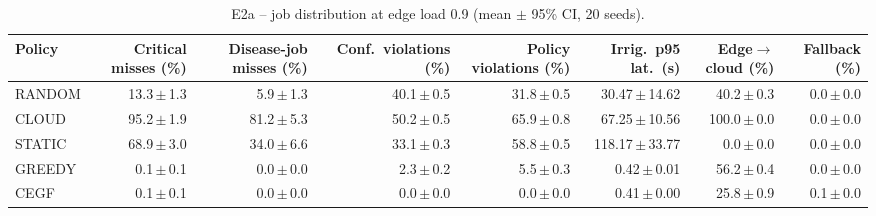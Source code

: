 \begin{table}[htbp]\scriptsize\centering
\caption{E2a -- job distribution at edge load 0.9 (mean $\pm$ 95\% CI, 20 seeds).}\label{tab:e2-0.9}
\begin{tabular}{lrrrrrrr}
\toprule
Policy & Critical misses (\%) & Disease-job misses (\%) & Conf.\ violations (\%) & Policy violations (\%) & Irrig.\ p95 lat.\ (s) & Edge$\to$cloud (\%) & Fallback (\%) \\
\midrule
RANDOM & 13.3\,$\pm$\,1.3 & 5.9\,$\pm$\,1.3 & 40.1\,$\pm$\,0.5 & 31.8\,$\pm$\,0.5 & 30.47\,$\pm$\,14.62 & 40.2\,$\pm$\,0.3 & 0.0\,$\pm$\,0.0 \\
CLOUD & 95.2\,$\pm$\,1.9 & 81.2\,$\pm$\,5.3 & 50.2\,$\pm$\,0.5 & 65.9\,$\pm$\,0.8 & 67.25\,$\pm$\,10.56 & 100.0\,$\pm$\,0.0 & 0.0\,$\pm$\,0.0 \\
STATIC & 68.9\,$\pm$\,3.0 & 34.0\,$\pm$\,6.6 & 33.1\,$\pm$\,0.3 & 58.8\,$\pm$\,0.5 & 118.17\,$\pm$\,33.77 & 0.0\,$\pm$\,0.0 & 0.0\,$\pm$\,0.0 \\
GREEDY & 0.1\,$\pm$\,0.1 & 0.0\,$\pm$\,0.0 & 2.3\,$\pm$\,0.2 & 5.5\,$\pm$\,0.3 & 0.42\,$\pm$\,0.01 & 56.2\,$\pm$\,0.4 & 0.0\,$\pm$\,0.0 \\
CEGF & 0.1\,$\pm$\,0.1 & 0.0\,$\pm$\,0.0 & 0.0\,$\pm$\,0.0 & 0.0\,$\pm$\,0.0 & 0.41\,$\pm$\,0.00 & 25.8\,$\pm$\,0.9 & 0.1\,$\pm$\,0.0 \\
\bottomrule
\end{tabular}
\end{table}